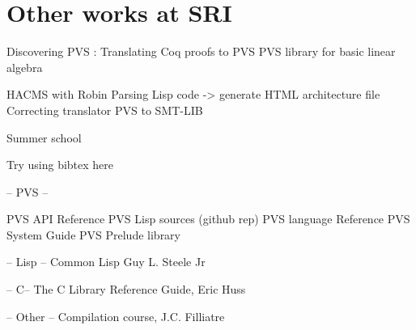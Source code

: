 \documentclass[12pt,a4paper,titlepage]{article}
\begin{document}
\section{Other works at SRI}
Discovering PVS :
Translating Coq proofs to PVS
PVS library for basic linear algebra


HACMS with Robin
Parsing Lisp code -> generate HTML architecture file
Correcting translator PVS to SMT-LIB

Summer school






Try using bibtex here

-- PVS --

PVS API Reference
PVS Lisp sources (github rep)
PVS language Reference
PVS System Guide
PVS Prelude library

-- Lisp --
Common Lisp Guy L. Steele Jr

-- C-- 
The C Library Reference Guide, Eric Huss

-- Other --
Compilation course, J.C. Filliatre


\cite{PVS:language}
\cite{PVS:manuals}
\cite{PVS:userguide}




\end{document}

